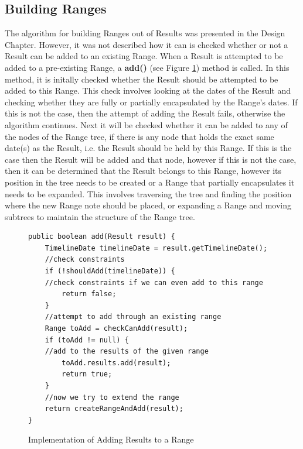 \subsection{Building Ranges}
\par The algorithm for building Ranges out of Results was presented in the Design Chapter. However, it was not described how it can is checked whether or not a Result can be added to an existing Range. When a Result is attempted to be added to a pre-existing Range, a \textbf{add()} (see Figure \ref{fig:addRangeImplementation}) method is called. In this method, it is initally checked whether the Result should be attempted to be added to this Range. This check involves looking at the dates of the Result and checking whether they are fully or partially encapsulated by the Range's dates. If this is not the case, then the attempt of adding the Result fails, otherwise the algorithm continues. Next it will be checked whether it can be added to any of the nodes of the Range tree, if there is any node that holds the exact same date(s) as the Result, i.e. the Result should be held by this Range. If this is the case then the Result will be added and that node, however if this is not the case, then it can be determined that the Result belongs to this Range, however its position in the tree needs to be created or a Range that partially encapsulates it needs to be expanded. This involves traversing the tree and finding the position where the new Range note should be placed, or expanding a Range and moving subtrees to maintain the structure of the Range tree.
\begin{figure}[H]
\begin{lstlisting}
public boolean add(Result result) {
    TimelineDate timelineDate = result.getTimelineDate();
    //check constraints
    if (!shouldAdd(timelineDate)) {
	//check constraints if we can even add to this range
        return false;
    }
    //attempt to add through an existing range
    Range toAdd = checkCanAdd(result);
    if (toAdd != null) {
	//add to the results of the given range
        toAdd.results.add(result);
        return true;
    }
    //now we try to extend the range
    return createRangeAndAdd(result);
}
\end{lstlisting}
\caption{Implementation of Adding Results to a Range}
\label{fig:addRangeImplementation}
\end{figure}
